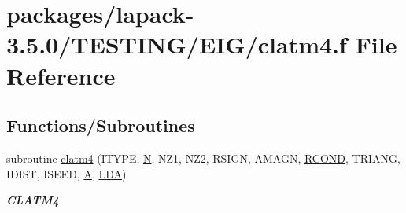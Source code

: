\hypertarget{clatm4_8f}{}\section{packages/lapack-\/3.5.0/\+T\+E\+S\+T\+I\+N\+G/\+E\+I\+G/clatm4.f File Reference}
\label{clatm4_8f}
\subsection*{Functions/\+Subroutines}
\begin{DoxyCompactItemize}
\item 
subroutine \hyperlink{group__complex__eig_ga30a0faa6bcbc4df466ebfab225b826a5}{clatm4} (I\+T\+Y\+P\+E, \hyperlink{polmisc_8c_a0240ac851181b84ac374872dc5434ee4}{N}, N\+Z1, N\+Z2, R\+S\+I\+G\+N, A\+M\+A\+G\+N, \hyperlink{superlu__enum__consts_8h_af00a42ecad444bbda75cde1b64bd7e72a9b5c151728d8512307565994c89919d5}{R\+C\+O\+N\+D}, T\+R\+I\+A\+N\+G, I\+D\+I\+S\+T, I\+S\+E\+E\+D, \hyperlink{classA}{A}, \hyperlink{example__user_8c_ae946da542ce0db94dced19b2ecefd1aa}{L\+D\+A})
\begin{DoxyCompactList}\small\item\em {\bfseries C\+L\+A\+T\+M4} \end{DoxyCompactList}\end{DoxyCompactItemize}
